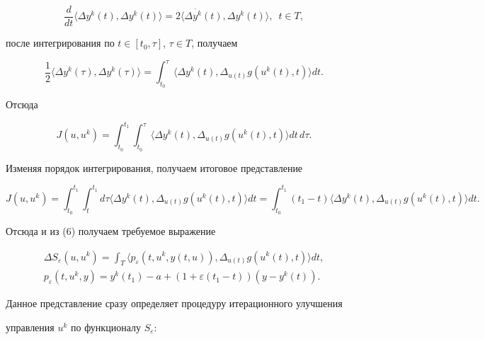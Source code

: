 $$


\frac{d}{dt}\langle\Delta y^{k}(t),\Delta y^{k}(t)\rangle=


2\langle\Delta \Dot{y^{k}}(t),\Delta y^{k}(t)\rangle,\ \;t\in T,


$$


после интегрирования по $t\in [t_{0},\tau]$, $\tau\in T$, получаем


$$


\frac{1}{2}\langle\Delta y^{k}(\tau),\Delta y^{k}(\tau)\rangle=


\int_{t_{0}}^\tau\langle\Delta y^{k}(t),\Delta_{u(t)}g(u^{k}(t),t)\rangle dt.


$$


Отсюда


$$


J(u,u^{k})=\int_{t_{0}}^{t_{1}}\int_{t_{0}}^{\tau}


\langle\Delta y^{k}(t),\Delta_{u(t)}g(u^{k}(t),t)\rangle dt\, d\tau.


$$


Изменяя порядок интегрирования, получаем итоговое представление


$$


J(u,u^{k})=\int_{t_{0}}^{t_{1}}\int_{t}^{t_{1}}d\tau


\langle\Delta y^{k}(t),\Delta_{u(t)}g(u^{k}(t),t)\rangle dt =


\int_{t_{0}}^{t_{1}}(t_{1}-t)


\langle\Delta y^{k}(t),\Delta_{u(t)}g(u^{k}(t),t)\rangle dt.


$$


Отсюда и из (6) получаем требуемое выражение


\begin{gather*}


\Delta S_{\varepsilon}(u,u^{k})=\int_{T}


\langle p_{\varepsilon}(t,u^{k},y(t,u)),


\Delta_{u(t)}g(u^{k}(t),t)\rangle dt, \\


%


p_{\varepsilon}(t,u^{k},y)=


y^{k}(t_{1})-a+(1+\varepsilon(t_{1}-t))(y-y^{k}(t)).


\end{gather*}


Данное представление сразу определяет процедуру итерационного улучшения


управления $u^{k}$ по функционалу $S_{\varepsilon}$:






